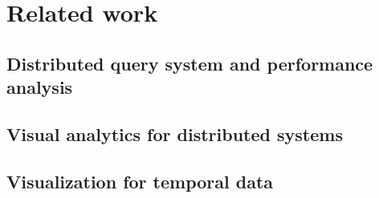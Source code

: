 \section{Related work}
\subsection{Distributed query system and performance analysis}
\subsection{Visual analytics for distributed systems}
\subsection{Visualization for temporal data}